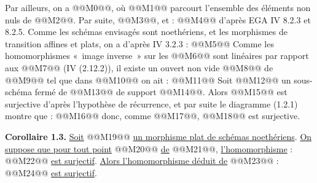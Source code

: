 
Par
ailleurs, on a @@M0@@, où @@M1@@ parcourt l'ensemble des éléments non nuls de @@M2@@. Par suite, @@M3@@, et :
@@M4@@
d'après EGA IV 8.2.3 et 8.2.5. Comme les schémas envisagés sont noethériens, et les morphismes de transition affines et plats, on a d'après IV 3.2.3 :
@@M5@@
Comme les homomorphismes «~image inverse~» sur les @@M6@@ sont linéaires par rapport aux @@M7@@ (IV (2.12.2)), il existe un ouvert non vide @@M8@@ de @@M9@@ tel que dans @@M10@@ on ait :
@@M11@@
Soit @@M12@@ un sous-schéma fermé de @@M13@@ de support @@M14@@. Alors @@M15@@ est surjective d'après l'hypothèse de récurrence, et par suite le diagramme (1.2.1) montre que :
@@M16@@
donc, comme @@M17@@, @@M18@@ est surjective.

\textbf{Corollaire 1.3.} \uline{Soit} @@M19@@ \uline{un morphisme plat de schémas noethériens}. \uline{On suppose que pour tout point} @@M20@@ \uline{de} @@M21@@, \uline{l'homomorphisme} :
@@M22@@
\uline{est surjectif}. \uline{Alors l'homomorphisme déduit de} @@M23@@ :
@@M24@@
\uline{est surjectif}.

